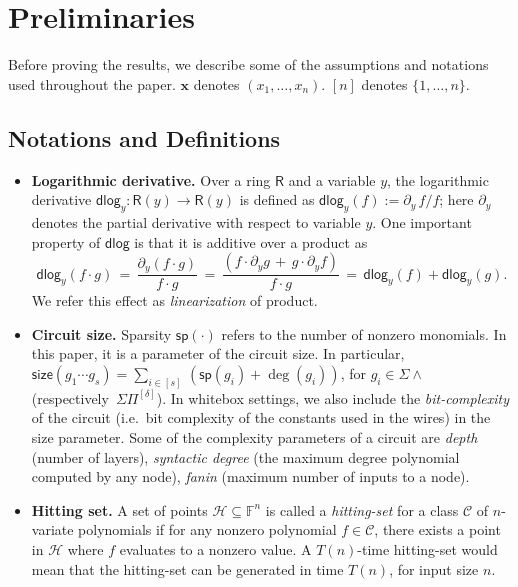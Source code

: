 \documentclass[10pt,a4paper]{article}
\newcommand{\F}{\mathbb{F}}
\newcommand{\ringR}{\mathsf{R}}
\newcommand{\x}{{\boldsymbol x}}
\newcommand{\calC}{\mathcal{C}}
\newcommand{\calH}{\mathcal{H}}
\renewcommand{\sp}{\mathsf{sp}}
\newcommand{\dlg}{\mathsf{dlog}}
\newcommand{\size}{\mathsf{size}}
\numberwithin{equation}{section}
\begin{document}
\section{Preliminaries}  \label{sec:prel}
Before proving the results, we describe some of the assumptions and notations used throughout the paper. $\x$ denotes $(x_1,\hdots,x_n)$. $[n]$ denotes $\{1,\hdots,n\}$.

\subsection{Notations and Definitions}

\smallskip
\begin{itemize}
    \item \textbf{Logarithmic derivative.} Over a ring $\ringR$ and a variable $y$, the logarithmic derivative $\dlg_{y} : \ringR(y) \to \ringR(y)$ is defined as $\dlg_{y}(f):=\partial_y\,f/f$; here $\partial_{y}$ denotes the partial derivative with respect to variable $y$. One important property of $\dlg$ is that it is additive over a product as \[\dlg_{y}(f \cdot g) \,=\, \frac{\partial_y(f \cdot g)}{f \cdot g} \,=\, \frac{(f \cdot \partial_y g \,+\, g \cdot \partial_y f)}{f \cdot g}\,=\,\dlg_{y}(f) + \dlg_y(g).\] 
    \noindent We refer this effect as \emph{linearization} of product.

    \item \textbf{Circuit size.} Sparsity $\sp(\cdot)$ refers to the number of nonzero monomials. In this paper, it is a parameter of the circuit size. In particular, $\size(g_1 \cdots g_s)=\sum_{i \in [s]}\,(\sp(g_i)+\deg(g_i))$, for $g_i \in \Sigma \wedge$ (respectively~$\Sigma \Pi^{[\delta]}$). In whitebox settings, we also include the \emph{bit-complexity} of the circuit (i.e.~bit complexity of the constants used in the wires) in the size parameter. 
    Some of the complexity parameters of a circuit are \emph{depth} (number of layers), \emph{syntactic degree} (the maximum degree polynomial computed
    by any node), {\em fanin} (maximum number of inputs to a node).

    \item \textbf{Hitting set.} A set of points $\calH \subseteq \F^n$ is called a \emph{hitting-set} for a class $\calC$ of $n$-variate polynomials if for any nonzero polynomial $f \in \calC$, there exists a point in $\calH$ where $f$ evaluates to a nonzero value. A $T(n)$-time hitting-set would mean that the hitting-set can be generated in time $T(n)$, for input size $n$. 


\end{itemize}
\end{document}
